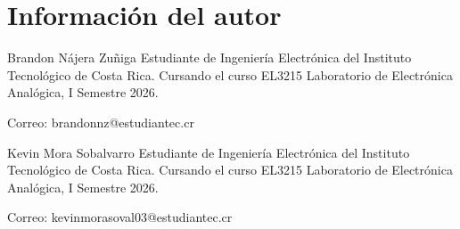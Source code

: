 \documentclass[journal]{IEEEtran}
\begin{document}
\section{Informaci\'on del autor}

\begin{IEEEbiographynophoto}{Brandon N\'ajera Zu\~niga}
Estudiante de Ingenier\'ia Electr\'onica del Instituto Tecnol\'ogico de Costa Rica. Cursando el curso EL3215 Laboratorio de Electr\'onica Anal\'ogica, I Semestre 2026.

Correo: brandonnz@estudiantec.cr
\end{IEEEbiographynophoto}
\begin{IEEEbiographynophoto}{Kevin Mora Sobalvarro}
Estudiante de Ingenier\'ia Electr\'onica del Instituto Tecnol\'ogico de Costa Rica. Cursando el curso EL3215 Laboratorio de Electr\'onica Anal\'ogica, I Semestre 2026.

Correo: kevinmorasoval03@estudiantec.cr
\end{IEEEbiographynophoto}
\vfill
\end{document}
